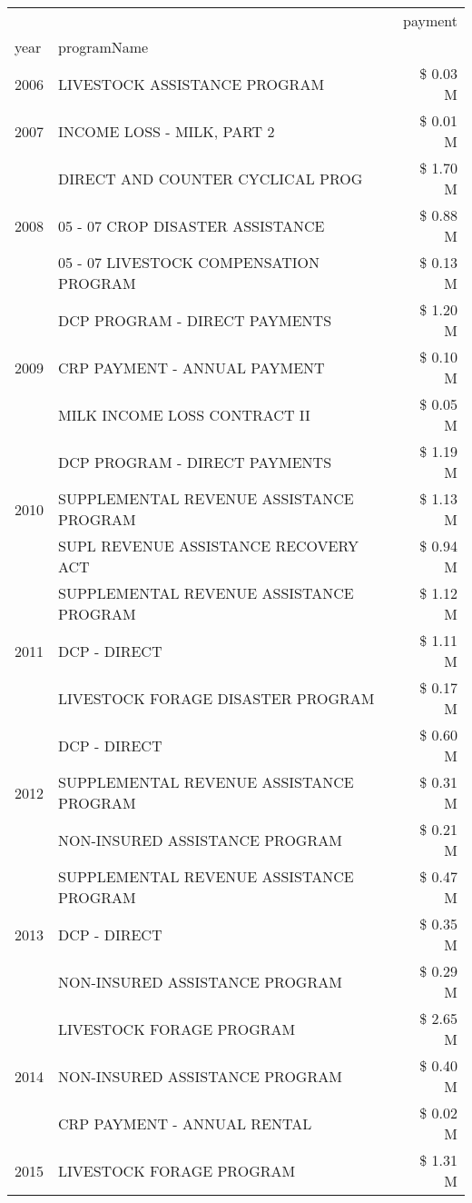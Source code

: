 \begin{tabular}{llr}
\toprule
 &  & payment \\
year & programName &  \\
\midrule
2006 & LIVESTOCK ASSISTANCE PROGRAM & \$ 0.03 M \\
\cline{1-3}
2007 & INCOME LOSS - MILK, PART 2 & \$ 0.01 M \\
\cline{1-3}
\multirow[t]{3}{*}{2008} & DIRECT AND COUNTER CYCLICAL PROG & \$ 1.70 M \\
 & 05 - 07 CROP DISASTER ASSISTANCE & \$ 0.88 M \\
 & 05 - 07 LIVESTOCK COMPENSATION PROGRAM & \$ 0.13 M \\
\cline{1-3}
\multirow[t]{3}{*}{2009} & DCP PROGRAM - DIRECT PAYMENTS & \$ 1.20 M \\
 & CRP PAYMENT - ANNUAL PAYMENT & \$ 0.10 M \\
 & MILK INCOME LOSS CONTRACT II & \$ 0.05 M \\
\cline{1-3}
\multirow[t]{3}{*}{2010} & DCP PROGRAM - DIRECT PAYMENTS & \$ 1.19 M \\
 & SUPPLEMENTAL REVENUE ASSISTANCE PROGRAM & \$ 1.13 M \\
 & SUPL REVENUE ASSISTANCE RECOVERY ACT & \$ 0.94 M \\
\cline{1-3}
\multirow[t]{3}{*}{2011} & SUPPLEMENTAL REVENUE ASSISTANCE PROGRAM & \$ 1.12 M \\
 & DCP - DIRECT & \$ 1.11 M \\
 & LIVESTOCK FORAGE DISASTER PROGRAM & \$ 0.17 M \\
\cline{1-3}
\multirow[t]{3}{*}{2012} & DCP - DIRECT & \$ 0.60 M \\
 & SUPPLEMENTAL REVENUE ASSISTANCE PROGRAM & \$ 0.31 M \\
 & NON-INSURED ASSISTANCE PROGRAM & \$ 0.21 M \\
\cline{1-3}
\multirow[t]{3}{*}{2013} & SUPPLEMENTAL REVENUE ASSISTANCE PROGRAM & \$ 0.47 M \\
 & DCP - DIRECT & \$ 0.35 M \\
 & NON-INSURED ASSISTANCE PROGRAM & \$ 0.29 M \\
\cline{1-3}
\multirow[t]{3}{*}{2014} & LIVESTOCK FORAGE PROGRAM & \$ 2.65 M \\
 & NON-INSURED ASSISTANCE PROGRAM & \$ 0.40 M \\
 & CRP PAYMENT - ANNUAL RENTAL & \$ 0.02 M \\
\cline{1-3}
\multirow[t]{3}{*}{2015} & LIVESTOCK FORAGE PROGRAM & \$ 1.31 M \\

\end{tabular}
